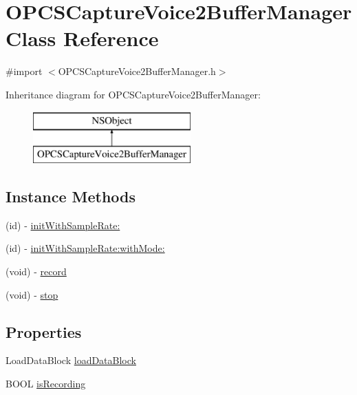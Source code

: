\hypertarget{interface_o_p_c_s_capture_voice2_buffer_manager}{}\section{O\+P\+C\+S\+Capture\+Voice2\+Buffer\+Manager Class Reference}
\label{interface_o_p_c_s_capture_voice2_buffer_manager}


{\ttfamily \#import $<$O\+P\+C\+S\+Capture\+Voice2\+Buffer\+Manager.\+h$>$}

Inheritance diagram for O\+P\+C\+S\+Capture\+Voice2\+Buffer\+Manager\+:\begin{figure}[H]
\begin{center}
\leavevmode
\includegraphics[height=2.000000cm]{interface_o_p_c_s_capture_voice2_buffer_manager}
\end{center}
\end{figure}
\subsection*{Instance Methods}
\begin{DoxyCompactItemize}
\item 
(id) -\/ \hyperlink{interface_o_p_c_s_capture_voice2_buffer_manager_ae6ccaffcb6da3c9abe3818cbf1219161}{init\+With\+Sample\+Rate\+:}
\item 
(id) -\/ \hyperlink{interface_o_p_c_s_capture_voice2_buffer_manager_a048d81d787f96d5409c23a09fc8239ce}{init\+With\+Sample\+Rate\+:with\+Mode\+:}
\item 
(void) -\/ \hyperlink{interface_o_p_c_s_capture_voice2_buffer_manager_a6568ab939086992e738fa6fc9c246aad}{record}
\item 
(void) -\/ \hyperlink{interface_o_p_c_s_capture_voice2_buffer_manager_a128ff30057dac0daf502f6d188a325b6}{stop}
\end{DoxyCompactItemize}
\subsection*{Properties}
\begin{DoxyCompactItemize}
\item 
Load\+Data\+Block \hyperlink{interface_o_p_c_s_capture_voice2_buffer_manager_a066b33fce715f27ea53a4c2f508e4457}{load\+Data\+Block}
\item 
B\+O\+OL \hyperlink{interface_o_p_c_s_capture_voice2_buffer_manager_a5e9fbf99d3c104971586ddefe48bbb56}{is\+Recording}
\end{DoxyCompactItemize}


